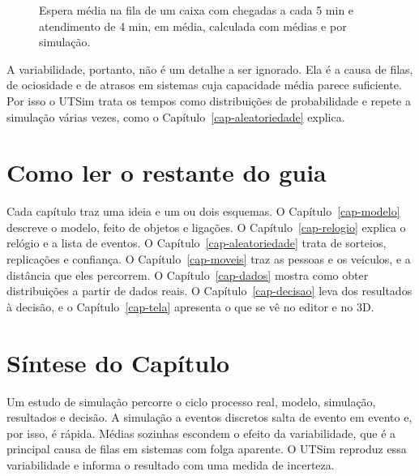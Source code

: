 \begin{figure}[ht]
\centering
{}
\caption{Espera média na fila de um caixa com chegadas a cada 5 min e atendimento de 4 min, em média, calculada com médias e por simulação.}
\label{fig-media}
\end{figure}

A variabilidade, portanto, não é um detalhe a ser ignorado. Ela é a causa de filas, de ociosidade e de atrasos em sistemas cuja capacidade média parece suficiente. Por isso o UTSim trata os tempos como distribuições de probabilidade e repete a simulação várias vezes, como o Capítulo~\ref{cap-aleatoriedade} explica.

\section{Como ler o restante do guia}

Cada capítulo traz uma ideia e um ou dois esquemas. O Capítulo~\ref{cap-modelo} descreve o modelo, feito de objetos e ligações. O Capítulo~\ref{cap-relogio} explica o relógio e a lista de eventos. O Capítulo~\ref{cap-aleatoriedade} trata de sorteios, replicações e confiança. O Capítulo~\ref{cap-moveis} traz as pessoas e os veículos, e a distância que eles percorrem. O Capítulo~\ref{cap-dados} mostra como obter distribuições a partir de dados reais. O Capítulo~\ref{cap-decisao} leva dos resultados à decisão, e o Capítulo~\ref{cap-tela} apresenta o que se vê no editor e no 3D.

\section{Síntese do Capítulo}

\begin{sintese}
Um estudo de simulação percorre o ciclo processo real, modelo, simulação, resultados e decisão. A simulação a eventos discretos salta de evento em evento e, por isso, é rápida. Médias sozinhas escondem o efeito da variabilidade, que é a principal causa de filas em sistemas com folga aparente. O UTSim reproduz essa variabilidade e informa o resultado com uma medida de incerteza.
\end{sintese}
